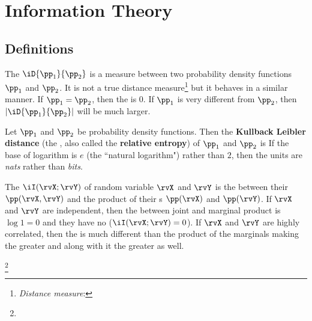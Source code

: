 \section{Information Theory}
\subsection{Definitions}
The  $\iD{\pp_1}{\pp_2}$  is a 
measure between two probability density functions $\pp_1$ and $\pp_2$.
It is not a true distance measure\footnote{
  {\em Distance measure}: 
  }
but it behaves in a similar manner.
If $\pp_1=\pp_2$, then the  is 0.
If $\pp_1$ is very different from $\pp_2$, then $|\iD{\pp_1}{\pp_2}|$ 
will be much larger.

\begin{definition}
\label{def:kld}
Let $\pp_1$ and $\pp_2$ be probability density functions.
Then the {\bf Kullback Leibler distance}
(the , also called the {\bf relative entropy})
of $\pp_1$ and $\pp_2$ is
If the base of logarithm is $e$ (the ``natural logarithm") rather than $2$,
then the units are {\em nats} rather than {\em bits}.
\end{definition}

The  $\iI(\rvX;\rvY)$ of random variable $\rvX$ and $\rvY$ is
the  between their  $\pp(\rvX,\rvY)$ and the 
product of their s $\pp(\rvX)$ and $\pp(\rvY)$.
If $\rvX$ and $\rvY$ are independent, then the  between 
joint and marginal product is $\log1=0$ and they have no 
 ($\iI(\rvX;\rvY)=0$).
If $\rvX$ and $\rvY$ are highly correlated, then the  is
much different than the product of the marginals making the 
greater and along with it the  greater as well.
\begin{definition}
\footnote{
  }
\label{def:I(X;Y)}
\end{definition}

